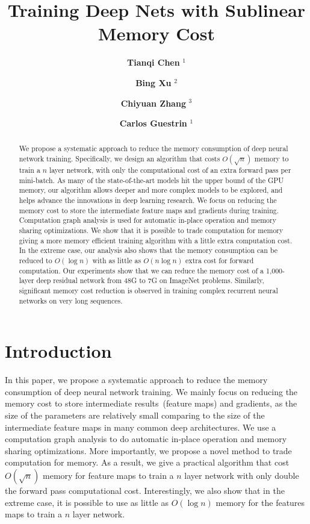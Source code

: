\documentclass{article} %
\title{Training Deep Nets with Sublinear Memory Cost}
\date{}
\author[]{\textbf{Tianqi Chen} $ ^1$}
\author[]{\textbf{Bing Xu} $ ^2$}
\author[]{\textbf{Chiyuan Zhang} $ ^3$}
\author[]{\textbf{Carlos Guestrin} $ ^1$}
\affil[]{$ ^1$ Unveristy of Washington \ \ $ ^2$ Dato. Inc \ \ $ ^3$ Massachusetts Institute of Technology }
\newcommand{\presec}{\vspace*{-2pt}}
\newcommand{\postsec}{\vspace*{-2pt}} %
\begin{document}
\maketitle
\begin{abstract}
We propose a systematic approach to reduce the memory consumption of deep neural network training.
Specifically, we design an algorithm that costs $O(\sqrt{n})$ memory
to train a $n$ layer network, with only the computational cost of an extra forward pass per
mini-batch.
As many of the state-of-the-art models hit the upper bound of the GPU memory,
our algorithm allows deeper and more complex models to be explored, and helps advance the
innovations in deep learning research.
We focus on reducing the memory cost to store the intermediate feature maps and gradients during training.
Computation graph analysis is used for automatic in-place operation and memory sharing optimizations.
We show that it is possible to trade computation for memory giving a more memory efficient training algorithm with a little extra computation cost.
In the extreme case, our analysis also shows that the memory consumption can be reduced to $O(\log
n)$ with as little as $O(n \log n)$ extra cost for forward computation.
Our experiments show that we can reduce the memory cost of a 1,000-layer deep residual network from
48G to 7G on ImageNet problems. Similarly, significant memory cost
reduction is observed in training complex recurrent neural networks on very long sequences.
\end{abstract}

\presec
\section{Introduction}
\postsec

In this paper, we propose a systematic approach to reduce the memory consumption of deep neural network training.
We mainly focus on reducing the memory cost to store intermediate results~(feature maps) and
gradients, as the size of the parameters are relatively small comparing to the size of
the intermediate feature maps in many common deep architectures.
We use a computation graph analysis to do automatic in-place operation and memory sharing optimizations.
More importantly, we propose a novel method to trade computation for memory.
As a result, we give a practical algorithm that cost $O(\sqrt{n})$ memory for feature maps to train
a $n$ layer network with only double the forward pass computational cost.
Interestingly, we also show that in the extreme case, it is possible to use as little as $O(\log n)$ memory for the features maps to train a $n$ layer network.
\end{document}
